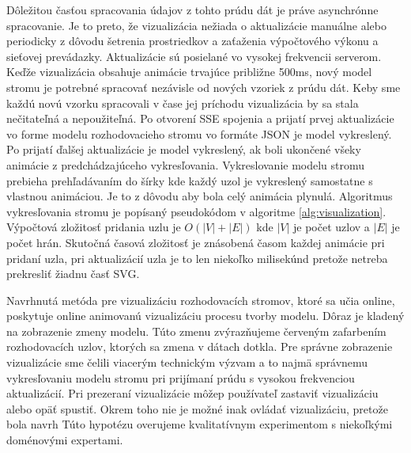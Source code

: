 Dôležitou časťou spracovania údajov z tohto prúdu dát je práve asynchrónne spracovanie. Je to preto, že vizualizácia nežiada o aktualizácie manuálne alebo periodicky z dôvodu šetrenia prostriedkov a zaťaženia výpočtového výkonu a sieťovej prevádazky. Aktualizácie sú posielané vo vysokej frekvencii serverom. Keďže vizualizácia obsahuje animácie trvajúce približne 500ms, nový model stromu je potrebné spracovať nezávisle od nových vzoriek z prúdu dát. Keby sme každú novú vzorku spracovali v čase jej príchodu vizualizácia by sa stala nečitateľná a nepoužiteľná. Po otvorení SSE spojenia a prijatí prvej aktualizácie vo forme modelu rozhodovacieho stromu vo formáte JSON je model vykreslený. Po prijatí ďalšej aktualizácie je model vykreslený, ak boli ukončené všeky animácie z predchádzajúceho vykresľovania. Vykreslovanie modelu stromu prebieha prehľadávaním do šírky kde každý uzol je vykreslený samostatne s vlastnou animáciou. Je to z dôvodu aby bola celý animácia plynulá. Algoritmus vykresľovania stromu je popísaný pseudokódom v algoritme \ref{alg:visualization}. Výpočtová zložitosť pridania uzlu je $O(|V| + |E|)$ kde $|V|$ je počet uzlov a $|E|$ je počet hrán. Skutočná časová zložitosť je znásobená časom každej animácie pri pridaní uzla, pri aktualizácií uzla je to len niekoľko milisekúnd pretože netreba prekresliť žiadnu časť SVG.
\par
Navrhnutá metóda pre vizualizáciu rozhodovacích stromov, ktoré sa učia online, poskytuje online animovanú vizualizáciu procesu tvorby modelu. Dôraz je kladený na zobrazenie zmeny modelu. Túto zmenu zvýrazňujeme červeným zafarbením rozhodovacích uzlov, ktorých sa zmena v dátach dotkla. Pre správne zobrazenie vizualizácie sme čelili viacerým technickým výzvam a to najmä správnemu vykresľovaniu modelu stromu pri prijímaní prúdu s vysokou frekvenciou aktualizácií. Pri prezeraní vizualizácie môžep používateľ zastaviť vizualizáciu alebo opäť spustiť. Okrem toho nie je možné inak ovládať vizualizáciu, pretože bola navrh Túto hypotézu overujeme kvalitatívnym experimentom s niekoľkými doménovými expertami.
\par

